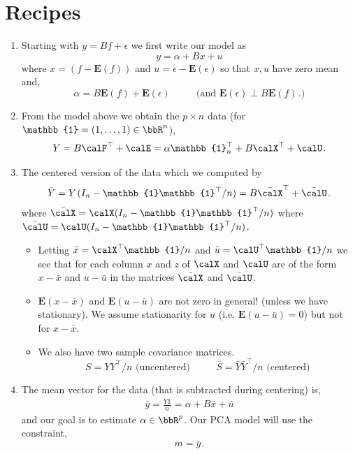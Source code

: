 \documentclass[12pt, leqno, letterpaper]{article}
\newcommand{\Exp}{\textbf{E}}
\newcommand{\ep}{\epsilon}
\newcommand{\s}[1][1]{\hspace{#1pt}}
\newcommand{\Id}{I}
\newcommand{\nes}{\mathbb{1}}
\begin{document}
\section{Recipes}


\begin{enumerate}
\item Starting with $y = B f + \ep$ we first write our model as
\[ y = \alpha  + B x +  u \]
where $x = (f - \Exp(f))$ and $u = \ep - \Exp(\ep)$ so 
that $x,u$ have zero mean and,
\[  \alpha = B \Exp(f) + \Exp(\ep) 
\s[32] \big(\text{and } \Exp(\ep) \perp B \Exp(f) \s . \big)\]

\item From the model above we obtain the $p \times n$
data (for $\nes = (1, \dots, 1) \in \bbR^n$),
\begin{align} \label{uY}
 Y = B \calF^\top + \calE = \alpha \nes_n^\top + 
B \calX^\top + \calU \s .
\end{align}
\item The centered version of the data which we computed by
\begin{align} \label{cY}  
\bar{Y} = Y\s ( \Id_n - \nes\nes^\top /n)
= B \bar{\calX}^\top + \bar{\calU} \s  .
\end{align}
where $\bar{\calX} = \calX ( \Id_n - \nes\nes^\top /n)$
where $\bar{\calU} = \calU ( \Id_n - \nes\nes^\top /n)$. 
\begin{itemize}
\item[--] Letting $\bar{x} = \calX^\top \nes/n$ and 
$\bar{u} = \calU^\top \nes/n$ we see that for each column $x$
and $z$ of $\calX$ and $\calU$ are of the form 
$x - \bar{x}$  and $u - \bar{u}$ 
in the matrices $\bar{\calX}$ and $\bar{\calU}$.
\item[--]  $\Exp(x - \bar{x})$ and 
$\Exp(u - \bar{u})$ are not zero in general! (unless
we have stationary). We assume stationarity 
for $u$ (i.e. $\Exp(u - \bar{u}) = 0$) but not for $x - \bar{x}$.
\item We also have two sample covariance matrices.
\[ S = YY^\top /n \text{ (uncentered)} \s[32]
 \bar{S} = \bar{Y}\bar{Y}^\top /n \text{ (centered)} \]
\end{itemize}
\item The mean vector for the data (that is subtracted during
centering) is, 
\begin{align}\label{by}
 \bar{y} = \frac{Y \nes}{ n \s } 
=  \alpha + B \bar{x} + \bar{u} \end{align}
and our goal is to estimate $\alpha \in \bbR^p$. Our
PCA model will use the constraint, \[ m  = \bar{y} \s . \]

\end{enumerate}
\end{document}
